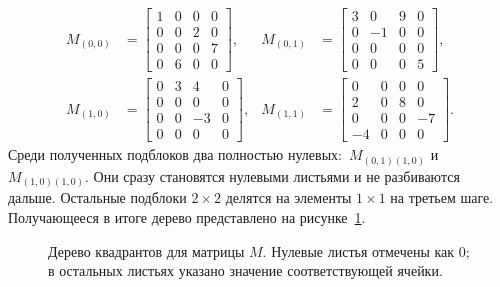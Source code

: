 \begin{align*}
    M_{(0,0)} &=
    \left[
        \begin{array}{cc|cc}
            1 & 0 & 0 & 0 \\
            0 & 0 & 2 & 0 \\
            \hline
            0 & 0 & 0 & 7 \\
            0 & 6 & 0 & 0
        \end{array}
    \right], &
    M_{(0,1)} &=
    \left[
        \begin{array}{cc|cc}
            3 & 0 & 9 & 0  \\
            0 & -1& 0 & 0  \\
            \hline
            0 & 0 & 0 & 0  \\
            0 & 0 & 0 & 5
        \end{array}
    \right], \\[10pt]
    M_{(1,0)} &=
    \left[
        \begin{array}{cc|cc}
            0 & 3 & 4  & 0 \\
            0 & 0 & 0  & 0 \\
            \hline
            0 & 0 & -3 & 0 \\
            0 & 0 & 0  & 0
        \end{array}
    \right], &
    M_{(1,1)} &=
    \left[
        \begin{array}{cc|cc}
             0  & 0 & 0 & 0  \\
             2  & 0 & 8 & 0  \\
             \hline
             0  & 0 & 0 & -7 \\
             -4 & 0 & 0 & 0
        \end{array}
    \right].
\end{align*}
Среди полученных подблоков два полностью нулевых:~$M_{(0,1)(1,0)}$ и $M_{(1,0)(1,0)}$.
Они сразу становятся нулевыми листьями и не разбиваются дальше.
Остальные подблоки $2 \times 2$ делятся на элементы $1 \times 1$ на третьем шаге.
Получающееся в итоге дерево представлено на рисунке~\ref{fig:QuadTree}.

\begin{figure}
    \centering
    \resizebox{\textwidth}{!}{}
    \caption{Дерево квадрантов для матрицы $M$. Нулевые листья отмечены как $0$; в остальных листьях указано значение соответствующей ячейки.}
    \label{fig:QuadTree}
\end{figure}


